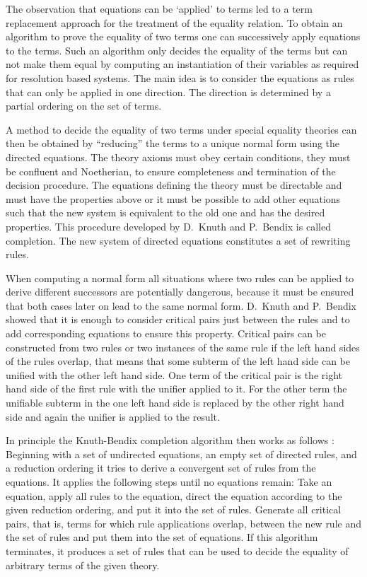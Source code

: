 The observation that equations can be `applied'
to terms led to a term replacement 
approach for the treatment of the equality relation.
To obtain an algorithm to prove the equality of two terms
one can successively apply equations to the
terms. Such an algorithm only decides the equality of the terms but
can not make them equal by computing an instantiation of
their variables as required for resolution based systems.
The main idea is to consider the equations as rules that can only be
applied in one direction. The direction is determined by a partial
ordering on the set of terms.

A method to decide the equality of two terms under
special equality theories can then be obtained by ``reducing'' the
terms to
a unique normal form using the directed equations. The theory axioms
must obey certain conditions, they must be 
confluent and Noetherian,
to ensure completeness
and termination of the decision procedure.
The equations defining the theory must be
directable and must have the properties above or it must be
possible to add other equations such that the new system
is equivalent to the old one and has the desired properties.
 This 
procedure developed by D.\ Knuth and P.\ Bendix \cite{KnBe70}
is called completion. 
The new system of directed equations
constitutes a set of rewriting 
rules. 

When computing a normal form all situations where two rules can be 
applied to derive different successors are potentially 
dangerous, because it must be 
ensured that both cases later 
on lead to the same normal form. D.\ Knuth 
and P.\ Bendix showed that it is enough to consider critical pairs just
between the
rules and to add corresponding equations to ensure this property.
Critical pairs can be constructed from two rules or two instances of the
same rule if the left hand sides of the rules overlap, that means that some
subterm of the left hand side can be unified with the other left hand
side. One term of the critical pair is the right hand side of the first
rule with the unifier applied to it. For the other term the unifiable subterm
in the one left hand side is replaced by the other right hand side and 
again the unifier is applied to the result.

In principle the Knuth-Bendix completion algorithm then works as follows
\cite{KnBe70,HuOp80,Buchberger85,Dershowitz87,JoLe87}:
Beginning with a set of undirected equations, an empty set of directed
rules, and a reduction ordering it tries to derive a convergent set of rules
from the equations. It applies the following steps
until no equations remain: Take an
equation, apply all rules to the equation, direct the equation according to
the given reduction ordering, and put it
into the set of rules. Generate all critical pairs, that is, terms for which
rule applications overlap, between the new rule and
the set of rules and put them into the set of equations. If this
algorithm terminates, it produces a set of rules that can be used to decide
the equality of arbitrary terms of the given theory.

